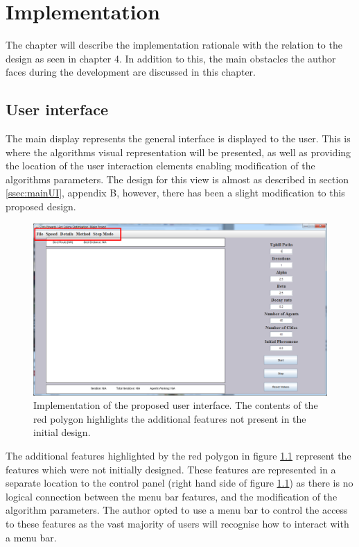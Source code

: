\chapter{Implementation}

The chapter will describe the implementation rationale with the relation to the design as seen in chapter 4. In addition to this, the main obstacles the author faces during the development are discussed in this chapter.

\section{User interface}
\label{mainimp}
The main display represents the general interface is displayed to the user. This is where the algorithms visual representation will be presented, as well as providing the location of the user interaction elements enabling modification of the algorithms parameters. The design for this view is almost as described in section \ref{ssec:mainUI}, appendix B, however, there has been a slight modification to this proposed design.

\begin{figure}[H]
\centering
\includegraphics[scale=0.3]{Images/chapter4/displayFrame}
\caption[Implementation of the User Interface]{Implementation of the proposed user interface. The contents of the red polygon highlights the additional features not present in the initial design.}
\label{fig:displayFrameImp}
\end{figure}

The additional features highlighted by the red polygon in figure \ref{fig:displayFrameImp} represent the features which were not initially designed. These features are represented in a separate location to the control panel (right hand side of figure \ref{fig:displayFrameImp}) as there is no logical connection between the menu bar features, and the modification of the algorithm parameters. The author opted to use a menu bar to control the access to these features as the vast majority of users will recognise how to interact with a menu bar.

